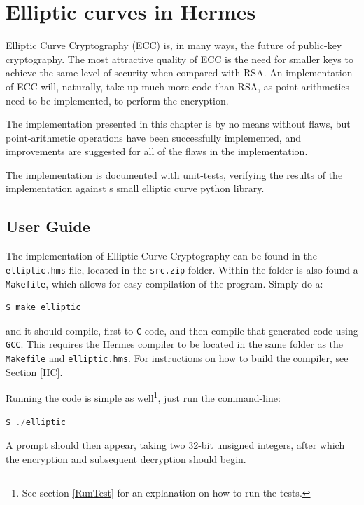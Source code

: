 
\chapter{Elliptic curves in Hermes}
\label{OurElliptic}
Elliptic Curve Cryptography (ECC) is, in many ways, the future of public-key cryptography\cite{ECCoverRSA}. The most attractive quality of ECC is the need for smaller keys to achieve the same level of security when compared with RSA. An implementation of ECC will, naturally, take up much more code than RSA, as point-arithmetics need to be implemented, to perform the encryption.

The implementation presented in this chapter is by no means without flaws, but point-arithmetic operations have been successfully implemented, and improvements are suggested for all of the flaws in the implementation.  

The implementation is documented with unit-tests, verifying the results of the implementation against s small elliptic curve python library.  

\section{User Guide}
The implementation of Elliptic Curve Cryptography can be found in the \texttt{elliptic.hms} file, located in the \texttt{src.zip} folder. Within the folder is also found a \texttt{Makefile}, which allows for easy compilation of the program. Simply do a:
\begin{lstlisting}[language=C]
  $ make elliptic
\end{lstlisting}%
and it should compile, first to \texttt{C}-code, and then compile that generated code using \texttt{GCC}. This requires the Hermes compiler to be located in the same folder as the \texttt{Makefile} and \texttt{elliptic.hms}. For instructions on how to build the compiler, see Section \ref{HC}.

Running the code is simple as well\footnote{See section \ref{RunTest} for an explanation on how to run the tests.}, just run the command-line:
\begin{lstlisting}[language=C]
  $ ./elliptic
\end{lstlisting}%
A prompt should then appear, taking two 32-bit unsigned integers, after which the encryption and subsequent decryption should begin. 

